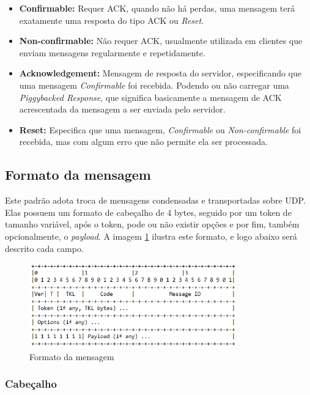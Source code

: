 \begin{itemize}
	\item \textbf{Confirmable:} Requer ACK, quando não há perdas, uma mensagem terá exatamente uma resposta do tipo ACK ou \textit{Reset}.
	\item \textbf{Non-confirmable:} Não requer ACK, usualmente utilizada em clientes que enviam mensagens regularmente e repetidamente.
	\item \textbf{Acknowledgement:} Mensagem de resposta do servidor, especificando que uma mensagem \textit{Confirmable} foi recebida. Podendo ou não carregar uma \textit{Piggybacked Response}, que significa basicamente a mensagem de ACK acrescentada da mensagem a ser enviada pelo servidor.
	\item \textbf{Reset:} Especifica que uma mensagem, \textit{Confirmable} ou \textit{Non-confirmable} foi recebida, mas com algum erro que não permite ela ser processada.		
\end{itemize}

\subsection{Formato da mensagem}

Este padrão adota troca de mensagens condensadas e transportadas sobre UDP. Elas possuem um formato de cabeçalho de 4 bytes, seguido por um token de tamanho variável, após o token, pode ou não existir opções e por fim, também opcionalmente, o \textit{payload}. A imagem \ref{fig:message_format} ilustra este formato, e logo abaixo será descrito cada campo.
%
\begin{figure}[!htb]
	\centering
	\includegraphics[width=0.8\textwidth]{MESSAGE_FORMAT}
	\caption{Formato da mensagem}
	\label{fig:message_format}
\end{figure}
%

\subsubsection{Cabeçalho}

